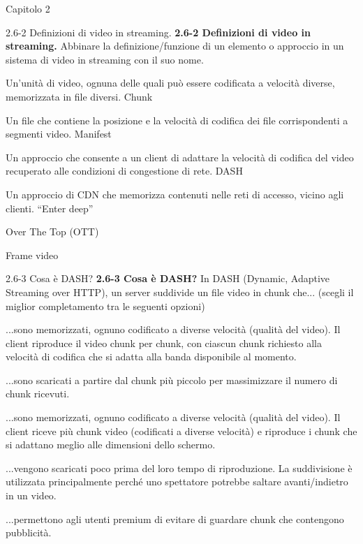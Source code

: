 \documentclass[11pt]{article}
\begin{document}
\begin{quiz}{Capitolo 2}
\begin{matching}[points=1,shuffle]{2.6-2 Definizioni di video in streaming.}
\textbf{2.6-2 Definizioni di video in streaming.}
Abbinare la definizione/funzione di un elemento o approccio in un sistema di video in streaming con il suo nome.
\item Un'unità di video, ognuna delle quali può essere codificata a velocità diverse, memorizzata in file diversi. \answer Chunk
\item Un file che contiene la posizione e la velocità di codifica dei file corrispondenti a segmenti video. \answer Manifest
\item Un approccio che consente a un client di adattare la velocità di codifica del video recuperato alle condizioni di congestione di rete. \answer DASH
\item Un approccio di CDN che memorizza contenuti nelle reti di accesso, vicino agli clienti. \answer ``Enter deep''
\item \answer Over The Top (OTT)
\item \answer Frame video
\end{matching}


\begin{multi}[points=1,shuffle]{2.6-3 Cosa è DASH?}
\textbf{2.6-3 Cosa è DASH?}
In DASH (Dynamic, Adaptive Streaming over HTTP), un server suddivide un file video in chunk che... (scegli il miglior completamento tra le seguenti opzioni)
\item* ...sono memorizzati, ognuno codificato a diverse velocità (qualità del video). Il client riproduce il video chunk per chunk, con ciascun chunk richiesto alla velocità di codifica che si adatta alla banda disponibile al momento.
\item ...sono scaricati a partire dal chunk più piccolo per massimizzare il numero di chunk ricevuti.
\item ...sono memorizzati, ognuno codificato a diverse velocità (qualità del video). Il client riceve più chunk video (codificati a diverse velocità) e riproduce i chunk che si adattano meglio alle dimensioni dello schermo.
\item ...vengono scaricati poco prima del loro tempo di riproduzione. La suddivisione è utilizzata principalmente perché uno spettatore potrebbe saltare avanti/indietro in un video.
\item ...permettono agli utenti premium di evitare di guardare chunk che contengono pubblicità.
\end{multi}


\end{quiz}
\end{document}
